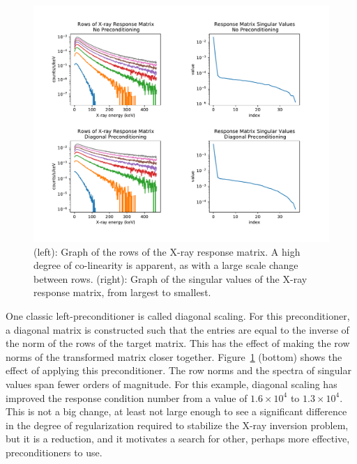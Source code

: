 \begin{figure}[p]
    \centering
    \includegraphics[width=1.1\textwidth]{figures/chapter_4/matrix_spectral_plot/fig.pdf}
    \caption{(left): Graph of the rows of the X-ray response matrix. A high degree of co-linearity is apparent, as with a large scale change between rows. (right): Graph of the singular values of the X-ray response matrix, from largest to smallest. }
    \label{matrix_spectral_plot}
\end{figure}

One classic left-preconditioner is called diagonal scaling. For this preconditioner, a diagonal matrix is constructed such that the entries are equal to the inverse of the norm of the rows of the target matrix. This has the effect of making the row norms of the transformed matrix closer together. Figure~\ref{matrix_spectral_plot} (bottom) shows the effect of applying this preconditioner. The row norms and the spectra of singular values span fewer orders of magnitude. For this example, diagonal scaling has improved the response condition number from a value of $1.6\times10^4$ to $1.3\times10^4$. This is not a big change, at least not large enough to see a significant difference in the degree of regularization required to stabilize the X-ray inversion problem, but it is a reduction, and it motivates a search for other, perhaps more effective, preconditioners to use. 